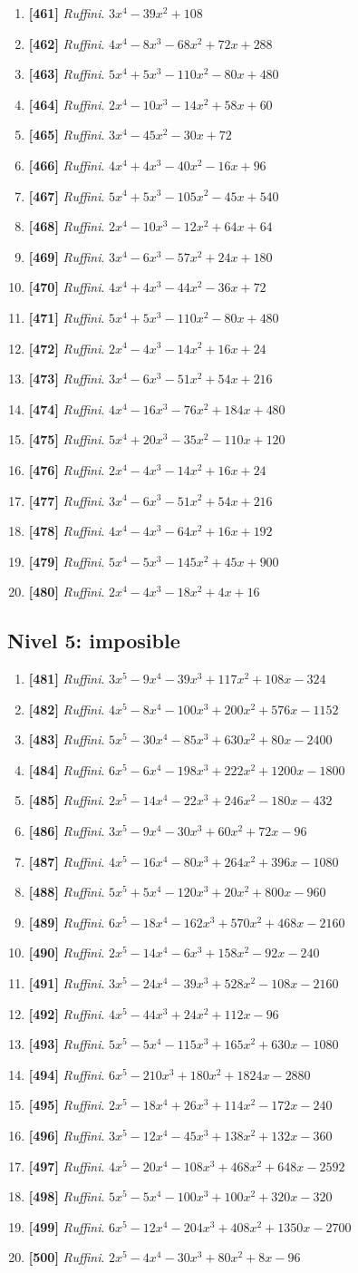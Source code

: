 \documentclass[11pt,a4paper]{article}
\newcommand{\nivel}[2]{\subsection*{Nivel #1: #2}\addcontentsline{toc}{subsection}{Nivel #1: #2}}
\newcommand{\ejercicio}[3]{\item \textbf{[#1]} \textit{#2}. $ #3 $}
\begin{document}
\begin{enumerate}
\ejercicio{461}{Ruffini}{3 x^{4} - 39 x^{2} + 108}
\ejercicio{462}{Ruffini}{4 x^{4} - 8 x^{3} - 68 x^{2} + 72 x + 288}
\ejercicio{463}{Ruffini}{5 x^{4} + 5 x^{3} - 110 x^{2} - 80 x + 480}
\ejercicio{464}{Ruffini}{2 x^{4} - 10 x^{3} - 14 x^{2} + 58 x + 60}
\ejercicio{465}{Ruffini}{3 x^{4} - 45 x^{2} - 30 x + 72}
\ejercicio{466}{Ruffini}{4 x^{4} + 4 x^{3} - 40 x^{2} - 16 x + 96}
\ejercicio{467}{Ruffini}{5 x^{4} + 5 x^{3} - 105 x^{2} - 45 x + 540}
\ejercicio{468}{Ruffini}{2 x^{4} - 10 x^{3} - 12 x^{2} + 64 x + 64}
\ejercicio{469}{Ruffini}{3 x^{4} - 6 x^{3} - 57 x^{2} + 24 x + 180}
\ejercicio{470}{Ruffini}{4 x^{4} + 4 x^{3} - 44 x^{2} - 36 x + 72}
\ejercicio{471}{Ruffini}{5 x^{4} + 5 x^{3} - 110 x^{2} - 80 x + 480}
\ejercicio{472}{Ruffini}{2 x^{4} - 4 x^{3} - 14 x^{2} + 16 x + 24}
\ejercicio{473}{Ruffini}{3 x^{4} - 6 x^{3} - 51 x^{2} + 54 x + 216}
\ejercicio{474}{Ruffini}{4 x^{4} - 16 x^{3} - 76 x^{2} + 184 x + 480}
\ejercicio{475}{Ruffini}{5 x^{4} + 20 x^{3} - 35 x^{2} - 110 x + 120}
\ejercicio{476}{Ruffini}{2 x^{4} - 4 x^{3} - 14 x^{2} + 16 x + 24}
\ejercicio{477}{Ruffini}{3 x^{4} - 6 x^{3} - 51 x^{2} + 54 x + 216}
\ejercicio{478}{Ruffini}{4 x^{4} - 4 x^{3} - 64 x^{2} + 16 x + 192}
\ejercicio{479}{Ruffini}{5 x^{4} - 5 x^{3} - 145 x^{2} + 45 x + 900}
\ejercicio{480}{Ruffini}{2 x^{4} - 4 x^{3} - 18 x^{2} + 4 x + 16}
\end{enumerate}
\nivel{5}{imposible}
\begin{enumerate}
\ejercicio{481}{Ruffini}{3 x^{5} - 9 x^{4} - 39 x^{3} + 117 x^{2} + 108 x - 324}
\ejercicio{482}{Ruffini}{4 x^{5} - 8 x^{4} - 100 x^{3} + 200 x^{2} + 576 x - 1152}
\ejercicio{483}{Ruffini}{5 x^{5} - 30 x^{4} - 85 x^{3} + 630 x^{2} + 80 x - 2400}
\ejercicio{484}{Ruffini}{6 x^{5} - 6 x^{4} - 198 x^{3} + 222 x^{2} + 1200 x - 1800}
\ejercicio{485}{Ruffini}{2 x^{5} - 14 x^{4} - 22 x^{3} + 246 x^{2} - 180 x - 432}
\ejercicio{486}{Ruffini}{3 x^{5} - 9 x^{4} - 30 x^{3} + 60 x^{2} + 72 x - 96}
\ejercicio{487}{Ruffini}{4 x^{5} - 16 x^{4} - 80 x^{3} + 264 x^{2} + 396 x - 1080}
\ejercicio{488}{Ruffini}{5 x^{5} + 5 x^{4} - 120 x^{3} + 20 x^{2} + 800 x - 960}
\ejercicio{489}{Ruffini}{6 x^{5} - 18 x^{4} - 162 x^{3} + 570 x^{2} + 468 x - 2160}
\ejercicio{490}{Ruffini}{2 x^{5} - 14 x^{4} - 6 x^{3} + 158 x^{2} - 92 x - 240}
\ejercicio{491}{Ruffini}{3 x^{5} - 24 x^{4} - 39 x^{3} + 528 x^{2} - 108 x - 2160}
\ejercicio{492}{Ruffini}{4 x^{5} - 44 x^{3} + 24 x^{2} + 112 x - 96}
\ejercicio{493}{Ruffini}{5 x^{5} - 5 x^{4} - 115 x^{3} + 165 x^{2} + 630 x - 1080}
\ejercicio{494}{Ruffini}{6 x^{5} - 210 x^{3} + 180 x^{2} + 1824 x - 2880}
\ejercicio{495}{Ruffini}{2 x^{5} - 18 x^{4} + 26 x^{3} + 114 x^{2} - 172 x - 240}
\ejercicio{496}{Ruffini}{3 x^{5} - 12 x^{4} - 45 x^{3} + 138 x^{2} + 132 x - 360}
\ejercicio{497}{Ruffini}{4 x^{5} - 20 x^{4} - 108 x^{3} + 468 x^{2} + 648 x - 2592}
\ejercicio{498}{Ruffini}{5 x^{5} - 5 x^{4} - 100 x^{3} + 100 x^{2} + 320 x - 320}
\ejercicio{499}{Ruffini}{6 x^{5} - 12 x^{4} - 204 x^{3} + 408 x^{2} + 1350 x - 2700}
\ejercicio{500}{Ruffini}{2 x^{5} - 4 x^{4} - 30 x^{3} + 80 x^{2} + 8 x - 96}
\end{enumerate}
\newpage
\end{document}
